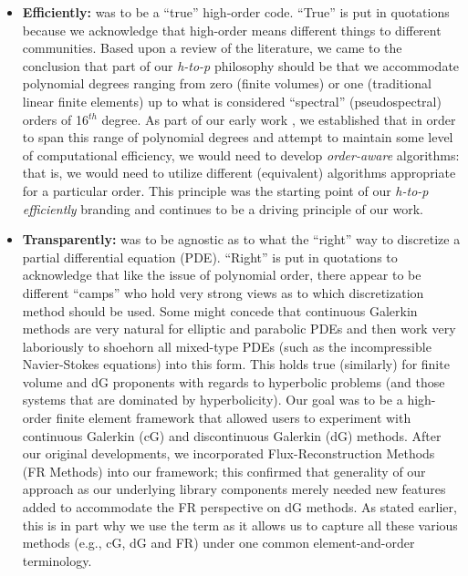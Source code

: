 \begin{itemize}
\item \textbf{Efficiently:} {\nek} was to be a ``true'' high-order code.  ``True'' is put in quotations because we acknowledge
that high-order means different things to different communities.  Based upon a review of the literature, we 
came to the conclusion that part of our {\em h-to-p} philosophy should be that we accommodate polynomial
degrees ranging from zero (finite volumes) or one (traditional linear finite elements) up to what is considered
``spectral'' (pseudospectral) orders of 16$^{th}$ degree.  As part of our early work \cite{VosSK2010}, we established that in
order to span this range of polynomial degrees and attempt to maintain some level of computational 
efficiency, we would need to develop {\em order-aware} algorithms:  that is, we would need to utilize
different (equivalent) algorithms appropriate for a particular order.  This principle was the starting point
of our {\em h-to-p efficiently} branding and continues to be a driving principle of our work. 

\item \textbf{Transparently:} {\nek} was to be agnostic as to what the ``right'' way to discretize a partial differential equation (PDE).
``Right'' is put in quotations to acknowledge that like the issue of polynomial order, there appear to be different
``camps'' who hold very strong views as to which discretization method should be used.   Some might concede that
continuous Galerkin methods are very natural for elliptic and parabolic PDEs and then work very laboriously to 
shoehorn all mixed-type PDEs (such as the incompressible Navier-Stokes equations) into this form.  This holds
true (similarly) for finite volume and dG proponents with regards to hyperbolic problems (and those systems that are
dominated by hyperbolicity).  Our goal was to be a high-order finite element framework that allowed users to experiment with
continuous Galerkin (cG) and discontinuous Galerkin (dG) methods.  After our original developments, we incorporated 
Flux-Reconstruction Methods (FR Methods) into our framework; this confirmed that generality of our approach as our
underlying library components merely needed new features added to accommodate the FR perspective on dG methods.
As stated earlier, this is in part why we use the term \shp{} as it allows us to capture all these various methods (e.g., cG, dG and FR)
under one common element-and-order terminology.


\end{itemize}
